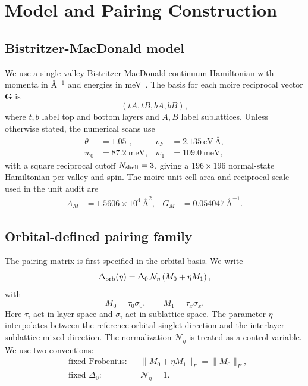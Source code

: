 \documentclass[aps,prb,reprint,superscriptaddress,floatfix,nofootinbib]{revtex4-2}
\begin{document}
\section{Model and Pairing Construction}

\subsection{Bistritzer-MacDonald model}

We use a single-valley Bistritzer-MacDonald continuum Hamiltonian with momenta
in \AA$^{-1}$ and energies in meV~\cite{bistritzer_2011}.
The basis for each moire reciprocal vector $\mathbf{G}$ is
\begin{equation}
  (tA,tB,bA,bB),
\end{equation}
where $t,b$ label top and bottom layers and $A,B$ label sublattices.
Unless otherwise stated, the numerical scans use
\begin{align}
  \theta &= 1.05^\circ, &
  v_F &= 2.135~\mathrm{eV}\,\text{\AA}, \nonumber\\
  w_0 &= 87.2~\mathrm{meV}, &
  w_1 &= 109.0~\mathrm{meV},
\end{align}
with a square reciprocal cutoff $N_{\rm shell}=3$, giving a $196\times196$
normal-state Hamiltonian per valley and spin.
The moire unit-cell area and reciprocal scale used in the unit audit are
\begin{align}
  A_M &= 1.5606\times 10^4~\text{\AA}^{2}, &
  G_M &= 0.054047~\text{\AA}^{-1}.
\end{align}

\subsection{Orbital-defined pairing family}

The pairing matrix is first specified in the orbital basis.  We write
\begin{equation}
  \Delta_{\rm orb}(\eta)
  =
  \Delta_0\,\mathcal{N}_{\eta}\left(M_0+\eta M_1\right),
\end{equation}
with
\begin{equation}
  M_0=\tau_0\sigma_0,\qquad
  M_1=\tau_x\sigma_x.
\end{equation}
Here $\tau_i$ act in layer space and $\sigma_i$ act in sublattice space.
The parameter $\eta$ interpolates between the reference orbital-singlet
direction and the interlayer-sublattice-mixed direction.
The normalization $\mathcal{N}_{\eta}$ is treated as a control variable.
We use two conventions:
\begin{align}
  &\text{fixed Frobenius:}
  &&\|M_0+\eta M_1\|_F=\|M_0\|_F,\\
  &\text{fixed }\Delta_0:
  &&\mathcal{N}_{\eta}=1.
\end{align}
\end{document}
